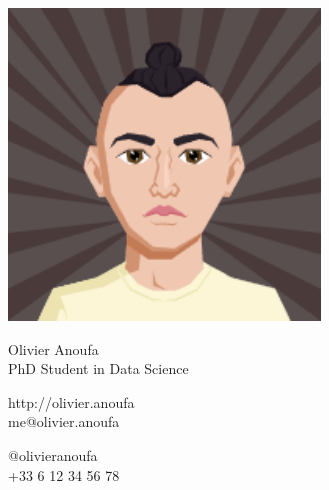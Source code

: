 \documentclass{article}
\begin{document}
\centering \includegraphics[width=.2\linewidth]{logo}\\[5pt]
\parbox{2in}{\Large \centering Olivier Anoufa\\[1pt]
\normalsize PhD Student in Data Science}

\vfill
\raggedright
\begin{multicols}{2}
http://olivier.anoufa\\
me@olivier.anoufa

\columnbreak
\raggedleft
@olivieranoufa\\
+33 6 12 34 56 78%
\end{multicols}%
\end{document}
